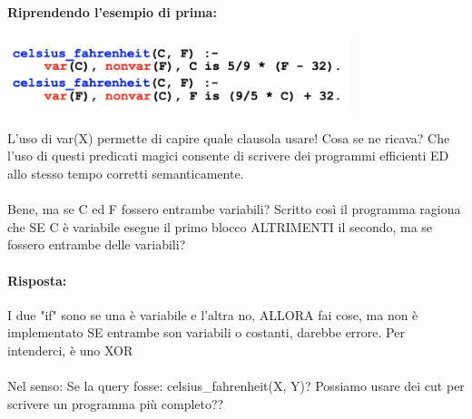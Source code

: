 \documentclass[12pt, a4paper, openany, oneside]{book}
\begin{document}
\paragraph{Riprendendo l'esempio di prima:}
\begin{center}
\includegraphics[width=0.75\textwidth]{6}
\end{center}
L'uso di var(X) permette di capire quale clausola usare! Cosa se ne ricava? Che
l'uso di questi predicati magici consente di scrivere dei programmi efficienti 
ED allo stesso tempo corretti semanticamente. \\ \\
Bene, ma se C ed F fossero entrambe variabili? Scritto così il programma ragiona
che SE C è variabile esegue il primo blocco ALTRIMENTI il secondo, ma se fossero
entrambe delle variabili?  
\paragraph{Risposta: } I due "if" sono se una è variabile e l'altra no, ALLORA 
fai cose, ma non è implementato SE entrambe son variabili o costanti, darebbe
errore. Per intenderci, è uno XOR\\ \\
Nel senso: Se la query fosse: celsius\_fahrenheit(X, Y)? Possiamo usare dei cut
per scrivere un programma più completo??
\end{document}
